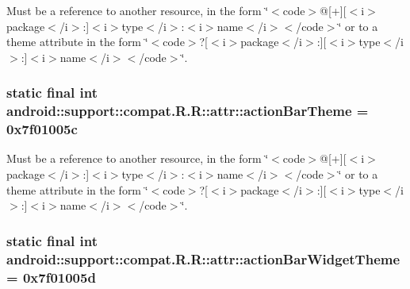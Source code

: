 Must be a reference to another resource, in the form \char`\"{}$<$code$>$@\mbox{[}+\mbox{]}\mbox{[}$<$i$>$package$<$/i$>$:\mbox{]}$<$i$>$type$<$/i$>$:$<$i$>$name$<$/i$>$$<$/code$>$\char`\"{} or to a theme attribute in the form \char`\"{}$<$code$>$?\mbox{[}$<$i$>$package$<$/i$>$:\mbox{]}\mbox{[}$<$i$>$type$<$/i$>$:\mbox{]}$<$i$>$name$<$/i$>$$<$/code$>$\char`\"{}. \hypertarget{classandroid_1_1support_1_1compat_1_1_r_1_1attr_4d3e2837e67c4394fffe8431d7e04dcd}{
\subsubsection[{actionBarTheme}]{\setlength{\rightskip}{0pt plus 5cm}static final int android::support::compat.R.R::attr::actionBarTheme = 0x7f01005c}}
\label{classandroid_1_1support_1_1compat_1_1_r_1_1attr_4d3e2837e67c4394fffe8431d7e04dcd}


Must be a reference to another resource, in the form \char`\"{}$<$code$>$@\mbox{[}+\mbox{]}\mbox{[}$<$i$>$package$<$/i$>$:\mbox{]}$<$i$>$type$<$/i$>$:$<$i$>$name$<$/i$>$$<$/code$>$\char`\"{} or to a theme attribute in the form \char`\"{}$<$code$>$?\mbox{[}$<$i$>$package$<$/i$>$:\mbox{]}\mbox{[}$<$i$>$type$<$/i$>$:\mbox{]}$<$i$>$name$<$/i$>$$<$/code$>$\char`\"{}. \hypertarget{classandroid_1_1support_1_1compat_1_1_r_1_1attr_875f94309baf6847fc8cd2a96d1721bb}{
\subsubsection[{actionBarWidgetTheme}]{\setlength{\rightskip}{0pt plus 5cm}static final int android::support::compat.R.R::attr::actionBarWidgetTheme = 0x7f01005d}}
\label{classandroid_1_1support_1_1compat_1_1_r_1_1attr_875f94309baf6847fc8cd2a96d1721bb}


